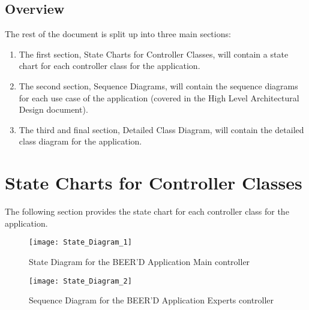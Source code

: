 \documentclass[]{article}
\begin{document}
\subsection{Overview}
\label{sub:overview}
The rest of the document is split up into three main sections:
\begin{enumerate}[-]
	\item The first section, State Charts for Controller Classes, will contain a state chart for each controller class for the application.
	\item The second section, Sequence Diagrams, will contain the sequence diagrams for each use case of the application (covered in the High Level Architectural Design document).
	\item The third and final section, Detailed Class Diagram, will contain the detailed class diagram for the application.
\end{enumerate}




\newpage
\section{State Charts for Controller Classes}
\label{sec:state_charts_for_controller_classes}
The following section provides the state chart for each controller class for the application.
\begin{figure}[!htbp]
\texttt{[image: State\_Diagram\_1]}
\caption{State Diagram for the BEER'D Application Main controller}
\end{figure}
\begin{figure}[!htbp]
\texttt{[image: State\_Diagram\_2]}
\caption{Sequence Diagram for the BEER'D Application Experts controller}
\end{figure}








\newpage
\end{document}

